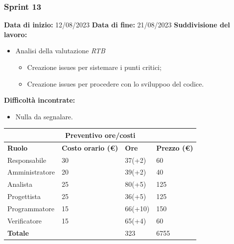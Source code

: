 \documentclass[a4paper, 12pt]{article}
\begin{document}
\subsubsection{Sprint 13}
\textbf{Data di inizio:} 12/08/2023\newline
\textbf{Data di fine:} 21/08/2023\newline
\newline
\textbf{Suddivisione del lavoro:}
\begin{itemize}
    \item Analisi della valutazione \textit{RTB}
    \begin{itemize}
        \item Creazione issues per sistemare i punti critici;
        \item Creazione issues per procedere con lo sviluppoo del codice. 
    \end{itemize}
\end{itemize}
\textbf{Difficoltà incontrate:}
\begin{itemize}
    \item Nulla da segnalare.
\end{itemize}
\begin{center}
	\begin{tabularx}{\textwidth}{|X|X|X|X|}
		\hline
		\multicolumn{4}{|c|}{\textbf{Preventivo ore/costi}}                                      \\
		\hline
		\hline
		\textbf{Ruolo}  & \textbf{Costo orario (\euro)} & \textbf{Ore} & \textbf{Prezzo (\euro)} \\
		\hline
		Responsabile    & 30                            & 37(+2)       & 60                     \\
		\hline
		Amministratore  & 20                            & 39(+2)       & 40                      \\
		\hline
		Analista        & 25                            & 80(+5)       & 125                       \\
		\hline
		Progettista     & 25                            & 36(+5)       &  125                     \\
		\hline
		Programmatore   & 15                            & 66(+10)      &  150                     \\
		\hline
		Verificatore    & 15                            & 65(+4)       &  60                     \\
		\hline
		\hline
		\textbf{Totale} &                               & 323          & 6755                    \\
		\hline
	\end{tabularx}\\[8pt]
	\mbox{}\\
\end{center}
\end{document}
